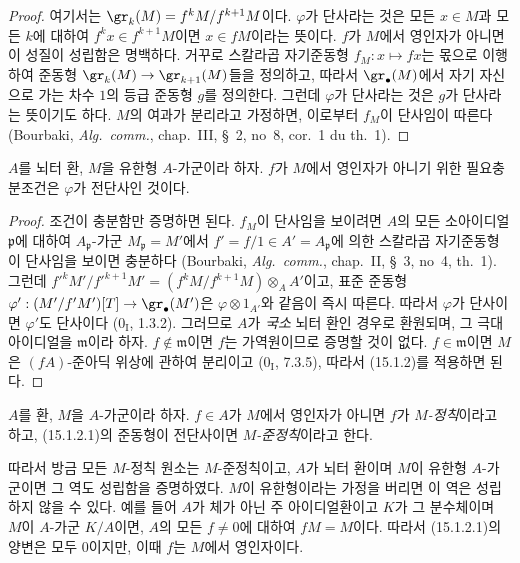 \begin{proof}
여기서는 $\gr_k(M)=f^kM/f^{k+1}M$이다. $\varphi$가 단사라는 것은 모든
$x\in M$과 모든 $k$에 대하여 $f^kx\in f^{k+1}M$이면 $x\in fM$이라는
뜻이다. $f$가 $M$에서 영인자가 아니면 이 성질이 성립함은 명백하다.
거꾸로 스칼라곱 자기준동형 $f_M:x\mapsto fx$는 몫으로 이행하여
준동형 $\gr_k(M)\to\gr_{k+1}(M)$들을 정의하고, 따라서
$\gr_\bullet(M)$에서 자기 자신으로 가는 차수 $1$의 등급 준동형 $g$를
정의한다. 그런데 $\varphi$가 단사라는 것은 $g$가 단사라는 뜻이기도
하다. $M$의 여과가 분리라고 가정하면, 이로부터 $f_M$이 단사임이
따른다 (Bourbaki, \emph{Alg.~comm.}, chap.~III, \S~2, no~8, cor.~1 du
th.~1).
\end{proof}

\begin{corollary}[15.1.3]
\label{0.15.1.3-fr}
$A$를 뇌터 환, $M$을 유한형 $A$-가군이라 하자. $f$가 $M$에서
영인자가 아니기 위한 필요충분조건은 $\varphi$가 전단사인 것이다.
\end{corollary}

\begin{proof}
조건이 충분함만 증명하면 된다. $f_M$이 단사임을 보이려면 $A$의 모든
소아이디얼 $\mathfrak p$에 대하여 $A_{\mathfrak p}$-가군
$M_{\mathfrak p}=M'$에서 $f'=f/1\in A'=A_{\mathfrak p}$에 의한
스칼라곱 자기준동형이 단사임을 보이면 충분하다 (Bourbaki,
\emph{Alg.~comm.}, chap.~II, \S~3, no~4, th.~1). 그런데
$f'^kM'/f'^{k+1}M'=(f^kM/f^{k+1}M)\otimes_A A'$이고, 표준 준동형
$\varphi':(M'/f'M')[T]\to\gr_\bullet(M')$은
$\varphi\otimes 1_{A'}$와 같음이 즉시 따른다. 따라서 $\varphi$가
단사이면 $\varphi'$도 단사이다 ($0_{\mathrm I}$, 1.3.2). 그러므로
$A$가 \emph{국소} 뇌터 환인 경우로 환원되며, 그 극대 아이디얼을
$\mathfrak m$이라 하자. $f\notin\mathfrak m$이면 $f$는 가역원이므로
증명할 것이 없다. $f\in\mathfrak m$이면 $M$은 $(fA)$-준아딕 위상에
관하여 분리이고 ($0_{\mathrm I}$, 7.3.5), 따라서 (15.1.2)를 적용하면
된다.
\end{proof}

\begin{definition}[15.1.4]
\label{0.15.1.4-fr}
$A$를 환, $M$을 $A$-가군이라 하자. $f\in A$가 $M$에서 영인자가
아니면 $f$가 \emph{$M$-정칙}이라고 하고, (15.1.2.1)의 준동형이
전단사이면 \emph{$M$-준정칙}이라고 한다.
\end{definition}

따라서 방금 모든 $M$-정칙 원소는 $M$-준정칙이고, $A$가 뇌터 환이며
$M$이 유한형 $A$-가군이면 그 역도 성립함을 증명하였다. $M$이 유한형이라는
가정을 버리면 이 역은 성립하지 않을 수 있다. 예를 들어 $A$가 체가 아닌
주 아이디얼환이고 $K$가 그 분수체이며 $M$이 $A$-가군 $K/A$이면,
$A$의 모든 $f\neq0$에 대하여 $fM=M$이다. 따라서 (15.1.2.1)의 양변은
모두 $0$이지만, 이때 $f$는 $M$에서 영인자이다.

